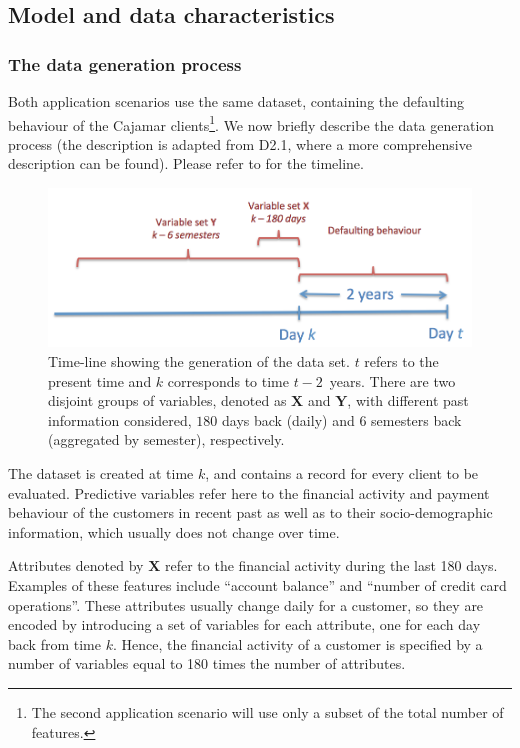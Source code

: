 \documentclass{article}
\theoremstyle{theorem}
\theoremstyle{definition}
\newcommand{\X}{\mathbf{X}}
\newcommand{\Y}{\mathbf{Y}}
\newcommand{\comment}[1]{ \begin{center}{\bf [[ #1 ]]}\end{center}}
\begin{document}
\subsection{Model and data characteristics}



\subsubsection{The data generation process}

Both application scenarios use the same dataset, containing the defaulting behaviour of the Cajamar clients\footnote{The second application scenario will use only a subset of the total number of features.}. We now briefly describe the data generation process (the description is adapted from D2.1, where a more comprehensive description can be found). Please refer to  for the timeline. 


\begin{figure}[ht!]
\centering
\includegraphics[scale=0.35]{figures/CajamarTimeLineReduced}
\caption{\label{fig:CajaMarTimeLineReduced}Time-line showing the generation of the data set. $t$ refers to the present time and $k$ corresponds to time $t-2$\ years. There are two disjoint groups of variables, denoted as $\X$ and $\Y$, with different past information considered, $180$ days back (daily) and $6$ semesters back (aggregated by semester), respectively.}
\end{figure}


The dataset is created at time $k$,  and contains a record for every client to be evaluated. 
Predictive variables refer here to the financial activity and payment behaviour of the customers in recent past as well as to their socio-demographic information, which usually does not change over time. 

Attributes denoted by $\X$ refer to the financial activity  during the last 180 days. Examples of these features include ``account balance'' and ``number of credit card operations''. 
These attributes usually change daily for a customer, so they are encoded by introducing a set of variables for each attribute, one for each day back from time $k$. 
Hence, the financial activity of a customer is specified by a number of variables equal to 180 times the number of attributes. 
\end{document}
